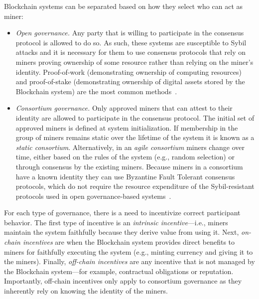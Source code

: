 Blockchain systems can be separated based on how they select who can act as miner:

\begin{itemize}
	\item \emph{Open governance.}
	Any party that is willing to participate in the consensus protocol is allowed to do so.
	As such, these systems are susceptible to Sybil attacks and it is necessary for them to use consensus protocols that rely on miners  proving ownership of some resource rather than relying on the miner's identity.
	Proof-of-work (demonstrating ownership of computing resources) and proof-of-stake (demonstrating ownership of digital assets stored by the Blockchain system) are the most common methods~\cite{Bano17,garay2018consensus}.
	
	\item \emph{Consortium governance.}
	Only approved miners that can attest to their identity are allowed to participate in the consensus protocol.
	The initial set of approved miners is defined at system initialization.
	If membership in the group of miners remains static over the lifetime of the system it is known as a \emph{static consortium}.
	Alternatively, in an \emph{agile consortium} miners change over time, either based on the rules of the system (e.g., random selection) or through consensus by the existing miners.
	Because miners in a consortium have a known identity they can use Byzantine Fault Tolerant consensus protocols, which do not require the resource expenditure of the Sybil-resistant protocols used in open governance-based systems~\cite{Bano17,garay2018consensus}.		
\end{itemize}

For each type of governance, there is a need to incentivize correct participant behavior.
The first type of incentive is an \emph{intrinsic incentive}---i.e., miners maintain the system faithfully because they derive value from using it.
Next, \emph{on-chain incentives} are when the Blockchain system provides direct benefits to miners for faithfully executing the system (e.g., minting currency and giving it to the miners).
Finally, \emph{off-chain incentives} are any incentive that is not managed by the Blockchain system---for example, contractual obligations or reputation.
Importantly, off-chain incentives only apply to consortium governance as they inherently rely on knowing the identity of the miners.

